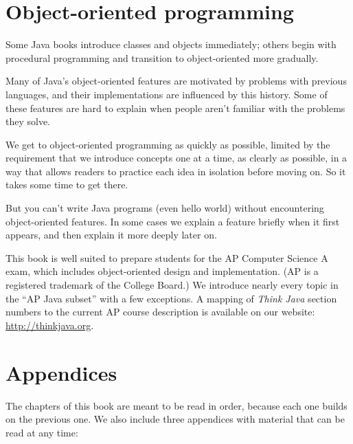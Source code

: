 \documentclass[12pt]{book}
\theoremstyle{exercise}
\begin{document}
\section*{Object-oriented programming}

Some Java books introduce classes and objects immediately; others begin with procedural programming and transition to object-oriented more gradually.

Many of Java's object-oriented features are motivated by problems with previous languages, and their implementations are influenced by this history.
Some of these features are hard to explain when people aren't familiar with the problems they solve.

We get to object-oriented programming as quickly as possible, limited by the requirement that we introduce concepts one at a time, as clearly as possible, in a way that allows readers to practice each idea in isolation before moving on.
So it takes some time to get there.

But you can't write Java programs (even hello world) without encountering object-oriented features.
In some cases we explain a feature briefly when it first appears, and then explain it more deeply later on.

This book is well suited to prepare students for the AP Computer Science A exam, which includes object-oriented design and implementation. (AP is a registered trademark of the College Board.)
We introduce nearly every topic in the ``AP Java subset'' with a few exceptions.
A mapping of {\em Think Java} section numbers to the current AP course description is available on our website: \url{http://thinkjava.org}.



\section*{Appendices}

The chapters of this book are meant to be read in order, because each one builds on the previous one.
We also include three appendices with material that can be read at any time:
\end{document}
